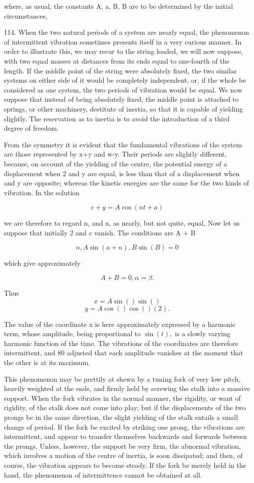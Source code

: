 where, as usual, the constants A, a, B, B are to be determined by the initial
circumstances,

114. When the two natural periods of a system are nearly equal, the phenomenon
of intermittent vibration sometimes presents itself in a very curious manner.
In order to illustrate this, we may recur to the string loaded, we will now
suppose, with two equal masses at distances from its ends equal to one-fourth
of the length. If the middle point of the string were absolutely fixed, the two
similar systems on either side of it would be completely independent, or, if
the whole be considered as one system, the two periods of vibration would be
equal. We now suppose that instead of being absolutely fixed, the middle point
is attached to springs, or other machinery, destitute of inertia, so that it is
capable of yielding slightly. The reservation as to inertia is to avoid the
introduction of a third degree of freedom.

From the symmetry it is evident that the fundamental vibrations of the system
are those represented by x+y and w-y. Their periods are slightly different,
because, on account of the yielding of the centre, the potential energy of a
displacement when 2 and y are equal, is less than that of a displacement when
and y are opposite; whereas the kinetic energies are the same for the two kinds
of vibration. In the solution

\[e+y=A \cos(nt+a)\]

we are therefore to regard n, and n, as nearly, but not quite, equal, Now let
us suppose that initially 2 and c vanish. The conditions are A + B

\[n,A \sin(a+n),B \sin(B)=0\]

which give approximately

\[A+B=0, \alpha = \beta .\]

Thus
\[x = A \sin()  \sin()\]
\[y = A \cos() \cos() (2).\]

The value of the coordinate x is here approximately expressed by a harmonic
term, whose amplitude, being proportional to \(\sin(t),\) is a slowly varying
harmonic function of the time. The vibrations of the coordinates are therefore
intermittent, and 80 adjusted that each amplitude vanishes at the moment that
the other is at its maximum.

This phenomenon may be prettily at shewn by a tuning fork of very low pitch,
heavily weighted at the ends, and firmly held by screwing the stalk into a
massive support. When the fork vibrates in the normal manner, the rigidity, or
want of rigidity, of the stalk does not come into play; but if the
displacements of the two prongs be in the same direction, the slight yielding
of the stalk entails a small change of period. If the fork be excited by
striking one prong, the vibrations are intermittent, and appear to transfer
themselves backwards and forwards between the prongs. Unless, however, the
support be very firm, the abnormal vibration, which involves a motion of the
centre of inertia, is soon dissipated; and then, of course, the vibration
appears to become steady. If the fork be merely held in the hand, the
phenomenon of intermittence cannot be obtained at all.


